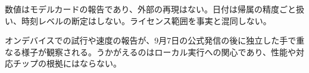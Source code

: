 \begin{claimboundary}[オープンモデルの境界]
数値はモデルカードの報告であり、外部の再現はない。日付は帰属の精度ごと扱い、時刻レベルの断定はしない。ライセンス範囲を事実と混同しない。
\end{claimboundary}

\begin{communitynote}
オンデバイスでの試行や速度の報告が、9月7日の公式発信の後に独立した手で重なる様子が観察される\cite{w37x-minicpm-official,w37x-minicpm-ind}。うかがえるのはローカル実行への関心であり、性能や対応チップの根拠にはならない。
\end{communitynote}
